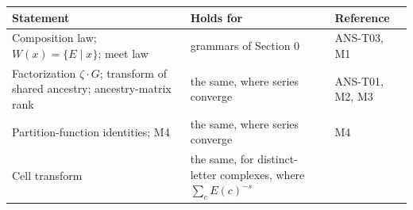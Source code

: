 \documentclass[
  11pt,
]{article}
\begin{document}
\begin{longtable}[]{@{}lll@{}}
\toprule
\begin{minipage}[b]{0.30\columnwidth}\raggedright
Statement\strut
\end{minipage} & \begin{minipage}[b]{0.40\columnwidth}\raggedright
Holds for\strut
\end{minipage} & \begin{minipage}[b]{0.22\columnwidth}\raggedright
Reference\strut
\end{minipage}\tabularnewline
\midrule
\endhead
\begin{minipage}[t]{0.30\columnwidth}\raggedright
Composition law; \(W(x)=\{E\mid x\}\); meet law\strut
\end{minipage} & \begin{minipage}[t]{0.40\columnwidth}\raggedright
grammars of Section 0\strut
\end{minipage} & \begin{minipage}[t]{0.22\columnwidth}\raggedright
ANS-T03, M1\strut
\end{minipage}\tabularnewline
\begin{minipage}[t]{0.30\columnwidth}\raggedright
Factorization \(\zeta\cdot G\); transform of shared ancestry;
ancestry-matrix rank\strut
\end{minipage} & \begin{minipage}[t]{0.40\columnwidth}\raggedright
the same, where series converge\strut
\end{minipage} & \begin{minipage}[t]{0.22\columnwidth}\raggedright
ANS-T01, M2, M3\strut
\end{minipage}\tabularnewline
\begin{minipage}[t]{0.30\columnwidth}\raggedright
Partition-function identities; M4\strut
\end{minipage} & \begin{minipage}[t]{0.40\columnwidth}\raggedright
the same, where series converge\strut
\end{minipage} & \begin{minipage}[t]{0.22\columnwidth}\raggedright
M4\strut
\end{minipage}\tabularnewline
\begin{minipage}[t]{0.30\columnwidth}\raggedright
Cell transform\strut
\end{minipage} & \begin{minipage}[t]{0.40\columnwidth}\raggedright
the same, for distinct-letter complexes, where \(\sum_cE(c)^{-s}\)

\end{minipage}
\end{longtable}
\end{document}
